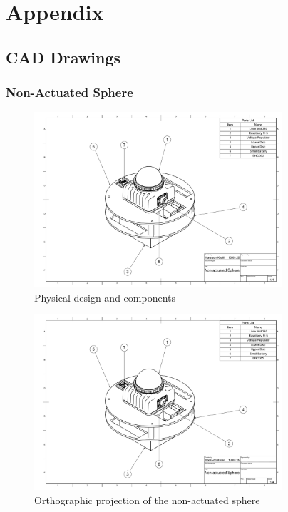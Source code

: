 \documentclass[english, bachelor, utf8]{base/thesis_telematics}
\begin{document}
\chapter{Appendix}

\section{CAD Drawings}
\subsection{Non-Actuated Sphere}
\label{sec:non-actuated-sphere-drawings}
\clearpage %

\begin{figure}[H]
\centering
\includegraphics[width=0.82\textwidth,page=1]{pics/Non_actuated_Sphere_drawing.pdf}
\caption{Physical design and components}
\label{fig:system_page1}
\end{figure}

\begin{figure}[H]
\centering
\includegraphics[width=0.82\textwidth,page=2]{pics/Non_actuated_Sphere_drawing.pdf}
\caption{Orthographic projection of the non-actuated sphere}
\label{fig:system_page2}
\end{figure}
\end{document}
